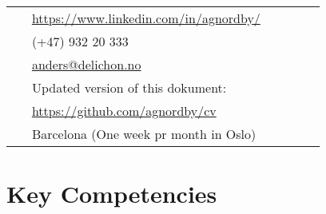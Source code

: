 \documentclass[10pt]{article} %
\begin{document}
\begin{paracol}{2}

\parbox[top][0.12\textheight][c]{\linewidth}{ %
	\vspace{-0.04\textheight} %
	\colorbox{shade}{ %
		\begin{supertabular}{p{0.05\linewidth}|p{0.775\linewidth}} %
			\raisebox{-1pt}{\faLinkedinSquare} & \href{https://www.linkedin.com/in/agnordby/}{https://www.linkedin.com/in/agnordby/} \\ %
			\raisebox{-1pt}{\faPhone} & (+47) 932 20 333 \\ %
			\raisebox{0pt}{\small\faEnvelope} & \href{mailto:anders@delichon.no}{anders@delichon.no} \\ %
			\raisebox{-1pt}{\faGithub} & Updated version of this dokument: \\ %
			\raisebox{-1pt}{} & \href{https://https://github.com/agnordby/cv}{https://github.com/agnordby/cv} \\ %
			\raisebox{-1pt}{\faHome} & Barcelona (One week pr month in Oslo) \\ %
		\end{supertabular}
	}
}


\section{Key Competencies}




\end{paracol}
\end{document}
